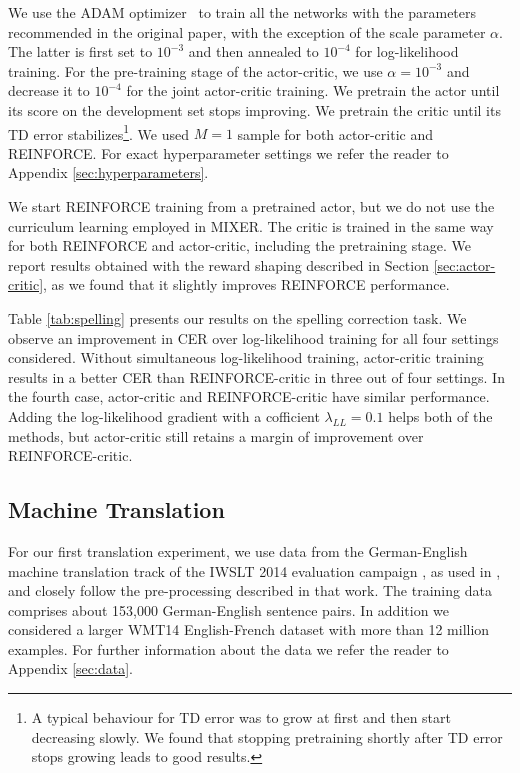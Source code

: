 \documentclass{article} %
\begin{document}
We use the ADAM optimizer~\citep{kingma2015method} to train all the networks
with the parameters recommended in the original paper, with the exception of
the scale parameter $\alpha$. The latter is first set to $10^{-3}$ and then
annealed to $10^{-4}$ for log-likelihood training. For the pre-training
stage of the actor-critic, we use $\alpha=10^{-3}$ and decrease it to
$10^{-4}$ for the joint actor-critic training. We pretrain the actor until
its score on the development set stops improving. We pretrain the critic until
its TD error stabilizes\footnote{A typical behaviour for TD error was to grow
at first and then start decreasing slowly.  We found that stopping pretraining
shortly after TD error stops growing leads to good results.}.  We used $M=1$
sample for both actor-critic and REINFORCE. For exact hyperparameter settings
we refer the reader to Appendix \ref{sec:hyperparameters}.

We start REINFORCE training from a pretrained actor, but we do
not use the curriculum learning employed in MIXER. The critic is trained in the
same way for both REINFORCE and actor-critic,
including the pretraining stage.
We report results obtained with the reward shaping described in Section
\ref{sec:actor-critic}, as we
found that it slightly improves REINFORCE performance.

Table \ref{tab:spelling} presents our results on the spelling correction task.
We observe an improvement in CER over log-likelihood training for all four settings considered.
Without simultaneous log-likelihood training,
actor-critic training results in a better CER than REINFORCE-critic 
in three out of four settings.
In the fourth case, actor-critic and REINFORCE-critic have similar
performance. Adding the log-likelihood gradient with a cofficient
$\lambda_{LL}=0.1$ helps both of the methods,
but actor-critic still retains a margin of improvement over REINFORCE-critic.
\subsection{Machine Translation}

For our first translation experiment, we use data from the German-English
machine translation track of the IWSLT 2014 evaluation campaign
\citep{cettolo2014report}, as used in \citet{ranzato2015sequence}, and closely follow the pre-processing described in
that work. The training data comprises about 153,000 German-English
sentence pairs. In addition we considered a larger WMT14 English-French dataset 
\cite{cho2014learning} with more than 12 million examples. For further information
about the data we refer the reader to Appendix \ref{sec:data}.
\end{document}
